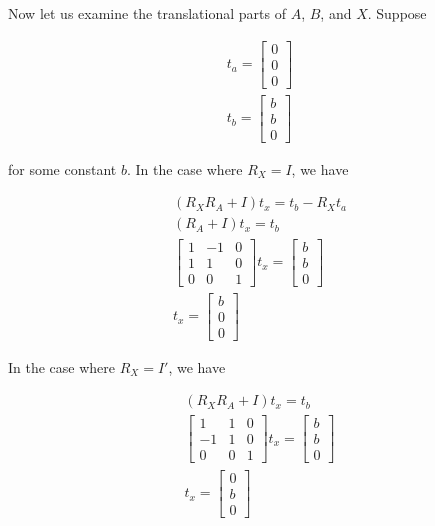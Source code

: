 Now let us examine the translational parts of $A$, $B$, and $X$. Suppose

\begin{align}
	t_a = \left[\begin{array}{c}
			0 \\ 0 \\ 0
		\end{array} \right] \\
	t_b = \left[\begin{array}{c}
			b \\ b \\ 0
		\end{array} \right]
\end{align}

for some constant $b$. In the case where $R_X = I$, we have

\begin{align}
	\left( R_X R_A + I \right) t_x = t_b - R_X t_a \\
	\left( R_A + I \right) t_x = t_b \\
	\left[\begin{array}{ccc}
		1 &  -1 & 0 \\
		1 & 1 & 0 \\
		0 & 0 & 1
	\end{array} \right] 
	t_x = \left[\begin{array}{c}
			b \\ b \\ 0
		\end{array} \right] \\
	t_x = \left[\begin{array}{c}
			b \\ 0 \\ 0
		\end{array} \right]
\end{align} 

In the case where $R_X = I'$, we have

\begin{align}
	\left( R_X R_A + I \right) t_x = t_b \\
	\left[\begin{array}{ccc}
		1 &  1 & 0 \\
		-1 & 1 & 0 \\
		0 & 0 & 1
	\end{array} \right] 
	t_x = \left[\begin{array}{c}
			b \\ b \\ 0
		\end{array} \right] \\
	t_x = \left[\begin{array}{c}
			0 \\ b \\ 0
		\end{array} \right]
\end{align}

